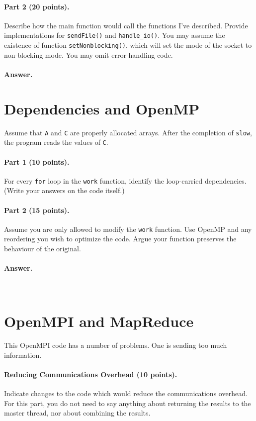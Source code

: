\documentclass[12pt]{article}
\begin{document}
\paragraph{Part 2 (20 points).} Describe how the main function would call the functions I've described.
Provide implementations for {\tt sendFile()} and {\tt handle\_io()}.
You may assume the existence of 
function {\tt setNonblocking()}, which will set the mode of the socket to
non-blocking mode. You may omit error-handling code.

\paragraph{Answer.}
\newpage

\section{Dependencies and OpenMP}
Assume that {\tt A} and
{\tt C} are properly allocated arrays. After the completion of {\tt slow}, the
program reads the values of {\tt C}.

\paragraph{Part 1 (10 points).} For every {\tt for} loop in the {\tt work} function,
identify the loop-carried dependencies. (Write your answers on the code itself.)

\paragraph{Part 2 (15 points).} Assume you are only allowed to modify the {\tt work}
function. Use OpenMP and any reordering you wish to optimize the code. Argue
your function preserves the behaviour of the original.

\paragraph{Answer.}~
\newpage

\section{OpenMPI and MapReduce}
This OpenMPI code has a number of problems. One is sending too
much information.


\paragraph{Reducing Communications Overhead (10 points).}
Indicate changes to the code
which would reduce the communications overhead. For this part,
you do not need to say anything about returning the results to the
master thread, nor about combining the results.
\end{document}
